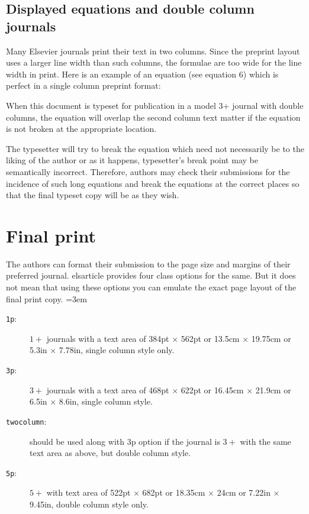 \documentclass[a4paper,12pt]{article}
\def\file#1{\textsf{#1}\xspace}
\begin{document}
	\subsection*{Displayed equations and double column journals}
	
	Many Elsevier journals print their text in two columns. Since
	the preprint layout uses a larger line width than such columns,
	the formulae are too wide for the line width in print. Here is an
	example of an equation  (see equation 6) which is perfect in a
	single column preprint format:
	
	\bigskip
	\setlength\Sep{6pt}
	\def\rulecolor{blue!70}
	\def\rulecolor{orange}
	                 	
	\noindent When this document is typeset for publication in a
	model 3+ journal with double columns, the equation will overlap
	the second column text matter if the equation is not broken at
	the appropriate location.
	
	\vspace*{6pt}
	\def\rulecolor{blue!70}
	\def\rulecolor{orange}
	
	\pagebreak
	
	\noindent The typesetter will try to break the equation which
	need not necessarily be to the liking of the author or as it
	happens, typesetter's break point may be semantically incorrect.
	Therefore, authors may check their submissions for the incidence
	of such long equations and break the equations at the correct
	places so that the final typeset copy will be as they wish.
	
	\section{Final print}\label{sec:final}
	
	The authors can format their submission to the page size and margins
	of their preferred journal.  \file{elsarticle} provides four
	class options for the same. But it does not mean that using these
	options you can emulate the exact page layout of the final print copy. 
	\lmrgn=3em
	\begin{description}
	\item [\texttt{1p}:] $1+$ journals with a text area of
	384pt $\times$ 562pt or 13.5cm $\times$ 19.75cm or 5.3in $\times$
	7.78in, single column style only.
	
	\item [\texttt{3p}:] $3+$ journals with a text area of 468pt
	$\times$ 622pt or 16.45cm $\times$ 21.9cm or 6.5in $\times$
	8.6in, single column style.
	
	\item [\texttt{twocolumn}:] should be used along with 3p option if the
	journal is $3+$ with the same text area as above, but double column
	style. 
	
	\item [\texttt{5p}:] $5+$ with text area of 522pt $\times$
	682pt or 18.35cm $\times$ 24cm or 7.22in $\times$ 9.45in,
	double column style only.
	\end{description}
	
\end{document}
